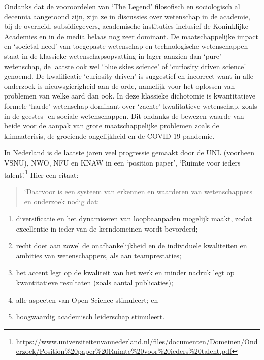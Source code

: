 \documentclass{jote-book}
\begin{document}
	Ondanks dat de vooroordelen van ‘The Legend' filosofisch en sociologisch al decennia aangetoond zijn, zijn ze in discussies over wetenschap in de academie, bij de overheid, subsidiegevers, academische instituties inclusief de Koninklijke Academies en in de media helaas nog zeer dominant. De maatschappelijke impact en ‘societal need' van toegepaste wetenschap en technologische wetenschappen staat in de klassieke wetenschapsopvatting in lager aanzien dan ‘pure' wetenschap, de laatste ook wel ‘blue skies science' of ‘curiosity driven science' genoemd. De kwalificatie ‘curiosity driven' is suggestief en incorrect want in alle onderzoek is nieuwsgierigheid aan de orde, namelijk voor het oplossen van problemen van welke aard dan ook. In deze klassieke dichotomie is kwantitatieve formele ‘harde' wetenschap dominant over ‘zachte' kwalitatieve wetenschap, zoals in de geestes- en sociale wetenschappen. Dit ondanks de bewezen waarde van beide voor de aanpak van grote maatschappelijke problemen zoals de klimaatcrisis, de groeiende ongelijkheid en de COVID-19 pandemie.



	In Nederland is de laatste jaren veel progressie gemaakt door de UNL (voorheen VSNU), NWO, NFU en KNAW in een ‘position paper', ‘Ruimte voor ieders talent'.\footnote{\href{https://www.universiteitenvannederland.nl/files/documenten/Domeinen/Onderzoek/Position\%20paper\%20Ruimte\%20voor\%20ieders\%20talent.pdf}{https://www.universiteitenvannederland.nl/files/documenten/Domeinen/Onderzoek/Position\%20paper\%20Ruimte\%20voor\%20ieders\%20talent.pdf}} Hier een citaat:

	\begin{quote}
		\itshape

		‘Daarvoor is een systeem van erkennen en waarderen van wetenschappers en onderzoek nodig dat:
	\end{quote}
	\begin{enumerate}


		\item diversificatie en het dynamiseren van loopbaanpaden mogelijk maakt, zodat excellentie in ieder van de kerndomeinen wordt bevorderd;



		\item recht doet aan zowel de onafhankelijkheid en de individuele kwaliteiten en ambities van wetenschappers, als aan teamprestaties;



		\item het accent legt op de kwaliteit van het werk en minder nadruk legt op kwantitatieve resultaten (zoals aantal publicaties);



		\item alle aspecten van Open Science stimuleert; en



		\item hoogwaardig academisch leiderschap stimuleert.


	\end{enumerate}
\end{document}
